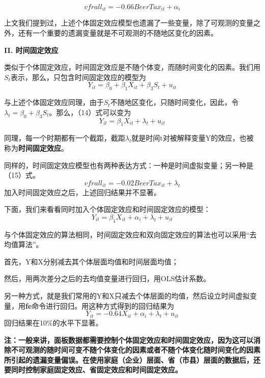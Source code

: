 \documentclass[cn,12pt,math=newtx,citestyle=gb7714-2015,bibstyle=gb7714-2015]{elegantbook}
\begin{document}
\begin{equation}
	vfrall_{it}=-0.66BeerTax_{it}+\alpha_i
\end{equation}

上文我们提到过，上述个体固定效应模型也遗漏了一些变量，除了可观测的变量之外，还有一个重要的遗漏变量就是不可观测的不随地区变化的因素。

\textbf{II. 时间固定效应}

类似于个体固定效应，时间固定效应是不随个体变，而随时间变化的因素。我们用$S_t$表示，那么，只包含时间固定效应的模型为
\begin{equation}
	Y_{it}=\beta_{0}+\beta_{1}X_{it}+\beta_{3}S_t+u_{it}
\end{equation}

与上述个体固定效应同理，由于$S_t$不随地区变化，只随时间变化，因此，令$\lambda_t=\beta_{0}+\beta_{3}S_t$。那么，（14）式可以变为
\begin{equation}
	Y_{it}=\beta_{1}X_{it}+\lambda_t+u_{it}
\end{equation}

同理，每一个时期都有一个截距，截距$\lambda_t$就是时间t对被解释变量Y的效应，也被称为\textbf{时间固定效应}。

同样的，时间固定效应模型也有两种表达方式：一种是时间虚拟变量；另一种是（15）式。
\begin{equation}
	vfrall_{it}=-0.02BeerTax_{it}+\lambda_t
\end{equation}
加入时间固定效应之后，上述回归结果并不显著。

下面，我们来看看同时加入个体固定效应和时间固定效应的模型：
\begin{equation}
	Y_{it}=\beta_{1}X_{it}+\alpha_i+\lambda_t+u_{it}
\end{equation}

与个体固定效应的算法相同，时间固定效应和双向固定效应的算法也可以采用“去均值算法”。

首先，Y和X分别减去其个体层面均值和时间层面均值；

然后，用两次差分之后的去均值变量进行回归，用OLS估计系数。

另一种方式，就是我们常用的Y和X只减去个体层面的均值，然后设立时间虚拟变量，用\textbf{fe}命令进行回归。用这种方式得到的回归结果为
\begin{equation}
	Y_{it}=-0.64X_{it}+\alpha_i+\lambda_t+u_{it}
\end{equation}
回归结果在10\%的水平下显著。

\textbf{注：一般来讲，面板数据都需要控制个体固定效应和时间固定效应，因为这可以消除不可观测的随时间可变不随个体变化的因素或者不随个体变化随时间变化的因素所引起的遗漏变量偏误。在使用家庭（企业）层面、省（市县）层面的数据后，还要同时控制家庭固定效应、省固定效应和时间固定效应。}
\end{document}
